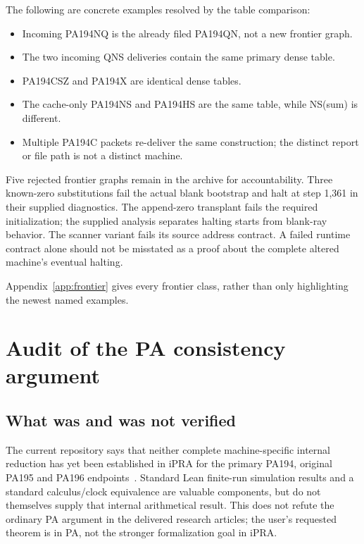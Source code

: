 \documentclass[11pt,letterpaper]{article}
\begin{document}
The following are concrete examples resolved by the table comparison:
\begin{itemize}
\item Incoming PA194NQ is the already filed PA194QN, not a new frontier graph.
\item The two incoming QNS deliveries contain the same primary dense table.
\item PA194CSZ and PA194X are identical dense tables.
\item The cache-only PA194NS and PA194HS are the same table, while NS(sum) is different.
\item Multiple PA194C packets re-deliver the same construction; the distinct report or file path is not a distinct machine.
\end{itemize}

Five rejected frontier graphs remain in the archive for accountability.
Three known-zero substitutions fail the actual blank bootstrap and halt
at step 1,361 in their supplied diagnostics. The append-zero transplant
fails the required initialization; the supplied analysis separates halting
starts from blank-ray behavior. The scanner variant fails its source
address contract. A failed runtime contract alone should not be misstated
as a proof about the complete altered machine's eventual halting.

Appendix~\ref{app:frontier} gives every frontier class, rather than only
highlighting the newest named examples.

\section{Audit of the PA consistency argument}
\label{sec:proofstatus}

\subsection{What was and was not verified}

The current repository says that neither complete machine-specific
internal reduction has yet been established in iPRA for the primary
PA194, original PA195 and PA196 endpoints~\cite{status}. Standard Lean
finite-run simulation results and a standard calculus/clock equivalence
are valuable components, but do not themselves supply that internal
arithmetical result. This does not refute the ordinary PA argument in
the delivered research articles; the user's requested theorem is in PA,
not the stronger formalization goal in iPRA.
\end{document}
